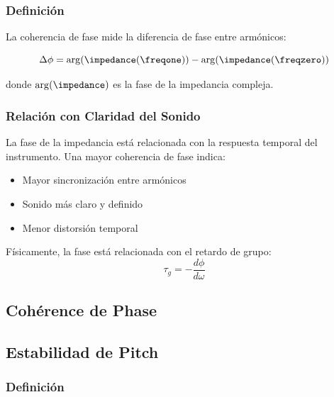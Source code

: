 \subsubsection{Definición}

La coherencia de fase mide la diferencia de fase entre armónicos:

\begin{equation}
\Delta\phi = \arg(\impedance(\freqone)) - \arg(\impedance(\freqzero))
\label{eq:phase_coherence}
\end{equation}

donde $\arg(\impedance)$ es la fase de la impedancia compleja.

\subsubsection{Relación con Claridad del Sonido}

La fase de la impedancia está relacionada con la respuesta temporal del instrumento. Una mayor coherencia de fase indica:

\begin{itemize}
    \item Mayor sincronización entre armónicos
    \item Sonido más claro y definido
    \item Menor distorsión temporal
\end{itemize}

Físicamente, la fase está relacionada con el retardo de grupo:
\begin{equation}
\tau_g = -\frac{d\phi}{d\omega}
\end{equation}

\subsection{Cohérence de Phase}


\subsection{Estabilidad de Pitch}

\subsubsection{Definición}

